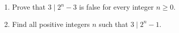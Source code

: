 \begin{enumerate}
\item[(a)] Prove that $3\mid2^n-3$ is false for every integer $n\ge0$.
\item[(b)] Find all positive integers $n$ such that $3\mid2^n-1$.
\end{enumerate}
